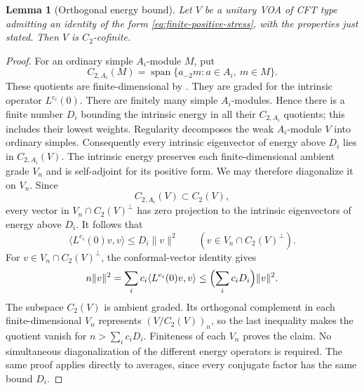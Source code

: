 \documentclass[11pt,a4paper]{article}
\newtheorem{lemma}[theorem]{Lemma}
\theoremstyle{definition}
\begin{document}
\begin{lemma}[Orthogonal energy bound]\label{lem:positive-c2}
Let $V$ be a unitary VOA of CFT type admitting an identity of the form
\eqref{eq:finite-positive-stress}, with the properties just stated.
Then $V$ is $C_2$-cofinite.
\end{lemma}
\begin{proof}
For an ordinary simple $A_i$-module $M$, put
\[
 C_{2,A_i}(M)=\operatorname{span}\{a_{-2}m:a\in A_i,\ m\in M\}.
\]
These quotients are finite-dimensional by \cite[Proposition~5.2]{ABD}.
They are graded for the intrinsic operator $L^{e_i}(0)$.
There are finitely many simple $A_i$-modules. Hence
there is a finite number $D_i$ bounding the intrinsic energy in all
their $C_{2,A_i}$ quotients; this includes their lowest weights.
Regularity decomposes the weak $A_i$-module $V$ into ordinary simples.
Consequently every intrinsic eigenvector of energy above $D_i$ lies
in $C_{2,A_i}(V)$. The intrinsic energy preserves each finite-dimensional
ambient grade $V_n$ and is self-adjoint for its positive form. We may
therefore diagonalize it on $V_n$. Since
\[
 C_{2,A_i}(V)\subset C_2(V),
\]
every vector in $V_n\cap C_2(V)^\perp$ has zero projection to the
intrinsic eigenvectors of energy above $D_i$. It follows that
\[
 \langle L^{e_i}(0)v,v\rangle\le D_i\|v\|^2
 \qquad (v\in V_n\cap C_2(V)^\perp).
\]
For $v\in V_n\cap C_2(V)^\perp$, the conformal-vector identity gives
\[
 n\|v\|^2
 =\sum_i c_i\langle L^{e_i}(0)v,v\rangle
 \le\Bigl(\sum_i c_iD_i\Bigr)\|v\|^2.
\]
The subspace $C_2(V)$ is ambient graded. Its orthogonal complement in
each finite-dimensional $V_n$ represents $(V/C_2(V))_n$, so the last
inequality makes the quotient vanish for
$n>\sum_i c_iD_i$. Finiteness of each $V_n$ proves the claim.
No simultaneous diagonalization of the different energy operators is
required. The same proof applies directly to averages, since every
conjugate factor has the same bound $D_i$.
\end{proof}
\end{document}
